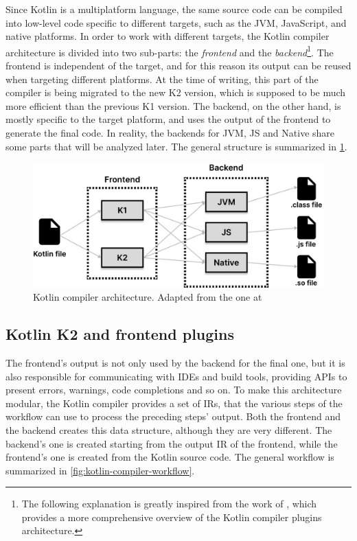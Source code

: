 \documentclass[12pt,a4paper,openright,twoside]{book}
\begin{document}
Since Kotlin is a multiplatform language, the same source code can be compiled
into low-level code specific to different targets, such as the JVM, JavaScript,
and native platforms. In order to work with different targets, the Kotlin
compiler architecture is divided into two sub-parts: the \emph{frontend} and the
\emph{backend}\footnote{The following explanation is greatly
inspired from the work of \cite{moskala2023}, which provides a more
comprehensive overview of the Kotlin compiler plugins architecture.}.
%
The frontend is independent of the target, and for this reason its output can be
reused when targeting different platforms. At the time of writing, this part of
the compiler is being migrated to the new K2 version, which is supposed to be
much more efficient than the previous K1 version.
%
The backend, on the other hand, is mostly specific to the target platform, and
uses the output of the frontend to generate the final code. In reality, the
backends for JVM, JS and Native share some parts that will be analyzed
later. The general structure is summarized in
\cref{fig:kotlin-compiler-architecture}.

\begin{figure}
  \centering
  \includegraphics[width=.8\linewidth]{figures/kotlin-compiler-architecture.pdf}
  \caption{Kotlin compiler architecture. Adapted from the one at \cite{moskala2023}}
  \label{fig:kotlin-compiler-architecture}
\end{figure}

\subsection{Kotlin K2 and frontend plugins}

The frontend's output is not only used by the backend for the final one, but it
is also responsible for communicating with \acp{IDE} and build tools, providing
APIs to present errors, warnings, code completions and so on. 
%
To make this architecture modular, the Kotlin compiler provides a set of 
\acp{IR}, that the various steps of the workflow
can use to process the preceding steps' output. Both the frontend and the
backend creates this data structure, although they are very different. The 
backend's one is created starting from the output \ac{IR} of the frontend,
while the frontend's one is created from the Kotlin source code. 
The general workflow is summarized in \cref{fig:kotlin-compiler-workflow}.
\end{document}
